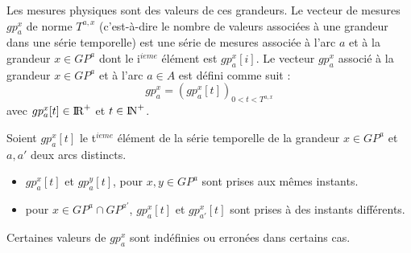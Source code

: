 Les mesures physiques sont des valeurs de ces grandeurs.
Le vecteur de mesures $gp_{a}^{x}$ de norme $T^{a,x}$ (c'est-\`a-dire le nombre de valeurs associ\'ees \`a une grandeur dans une s\'erie temporelle) est une s\'erie de mesures associ\'ee \`a l'arc $a$ et \`a la grandeur $x \in  GP^{a}$ dont le i$^{ieme}$ \'el\'ement est  $gp_{a}^{x}[i]$.
Le vecteur $gp_{a}^{x}$ associ\'e \`a la grandeur $x \in GP^{a}$ et \`a l'arc $a \in A$ est d\'efini comme suit :
\begin{equation}
	gp_{a}^{x} = ( gp_{a}^{x}[t] )_{0 < t < T^{a, x} }
\end{equation}
avec $ gp_{a}^{x}[t] \in \mbox{I\hspace{-.15em}R}^{+}$ et $ t \in \mbox{I\hspace{-.15em}N}^{+}$.
\begin{remark}
\label{remarque} 
Soient  $gp_{a}^{x}[t]$ le t$^{ieme}$ \'el\'ement de la s\'erie temporelle de la grandeur $x \in GP^{a}$ et $a, a'$ deux  arcs distincts.
\begin{itemize}
	\item  $gp_{a}^{x}[t]$ et  $gp_{a}^{y}[t]$, pour $x, y \in GP^{a}$ sont prises aux m\^emes instants.
	\item  pour $x\in GP^{a} \cap GP^{a'}$,  $gp_{a}^{x}[t]$ et  $gp_{a'}^{x}[t]$  sont prises \`a des instants diff\'erents.
\end{itemize}
\end{remark}
Certaines valeurs de $ gp_{a}^{x}$ sont ind\'efinies ou erron\'ees dans certains cas.
